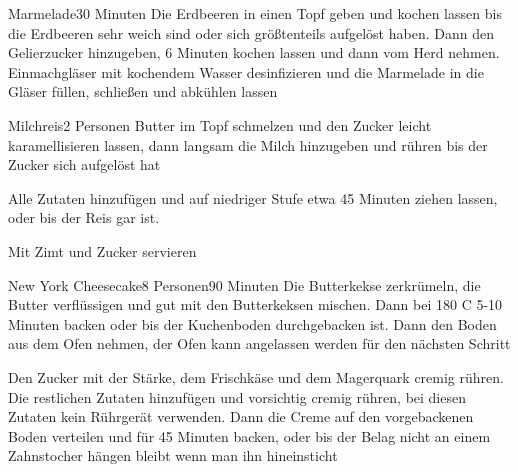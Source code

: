 
\begin{recipe}{Marmelade}{}{30 Minuten}
Die Erdbeeren in einen Topf geben und kochen lassen bis die Erdbeeren sehr weich sind oder sich größtenteils aufgelöst haben. Dann den Gelierzucker hinzugeben, 6 Minuten kochen lassen und dann vom Herd nehmen. Einmachgläser mit kochendem Wasser desinfizieren und die Marmelade in die Gläser füllen, schließen und abkühlen lassen
\end{recipe}


\begin{recipe}{Milchreis}{2 Personen}{}
Butter im Topf schmelzen und den Zucker leicht karamellisieren lassen, dann langsam die Milch hinzugeben und rühren bis der Zucker sich aufgelöst hat

Alle Zutaten hinzufügen und auf niedriger Stufe etwa 45 Minuten ziehen lassen, oder bis der Reis gar ist.

Mit Zimt und Zucker servieren
\end{recipe}


\begin{recipe}{New York Cheesecake}{8 Personen}{90 Minuten}
Die Butterkekse zerkrümeln, die Butter verflüssigen und gut mit den Butterkeksen mischen. Dann bei 180 \0C 5-10 Minuten backen oder bis der Kuchenboden durchgebacken ist. Dann den Boden aus dem Ofen nehmen, der Ofen kann angelassen werden für den nächsten Schritt

Den Zucker mit der Stärke, dem Frischkäse und dem Magerquark cremig rühren. Die restlichen Zutaten hinzufügen und vorsichtig cremig rühren, bei diesen Zutaten kein Rührgerät verwenden. Dann die Creme auf den vorgebackenen Boden verteilen und für 45 Minuten backen, oder bis der Belag nicht an einem Zahnstocher hängen bleibt wenn man ihn hineinsticht
\end{recipe} 

